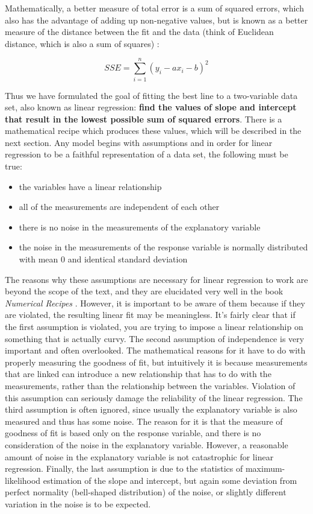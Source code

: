 \documentclass[
  letterpaper,
  DIV=11,
  numbers=noendperiod]{scrreprt}
\begin{document}
Mathematically, a better measure of total error is a sum of squared
errors, which also has the advantage of adding up non-negative values,
but is known as a better measure of the distance between the fit and the
data (think of Euclidean distance, which is also a sum of squares)
:

\[ SSE = \sum_{i=1}^n ( y_i -  a x_i - b )^2 \]

Thus we have formulated the goal of fitting the best line to a
two-variable data set, also known as linear regression: \textbf{find the
values of slope and intercept that result in the lowest possible sum of
squared errors}. There is a mathematical recipe which produces these
values, which will be described in the next section. Any model begins
with  assumptions and in order for
linear regression to be a faithful representation of a data set, the
following must be true:

\begin{itemize}
\item
  the variables have a linear relationship
\item
  all of the measurements are independent of each other
\item
  there is no noise in the measurements of the explanatory variable
\item
  the noise in the measurements of the response variable is normally
  distributed with mean 0 and identical standard deviation
\end{itemize}

The reasons why these assumptions are necessary for linear regression to
work are beyond the scope of the text, and they are elucidated very well
in the book \emph{Numerical Recipes} \cite{press_numerical_2007}.
However, it is important to be aware of them because if they are
violated, the resulting linear fit may be meaningless. It's fairly clear
that if the first assumption is violated, you are trying to impose a
linear relationship on something that is actually curvy. The second
assumption of independence is very important and often overlooked. The
mathematical reasons for it have to do with properly measuring the
goodness of fit, but intuitively it is because measurements that are
linked can introduce a new relationship that has to do with the
measurements, rather than the relationship between the variables.
Violation of this assumption can seriously damage the reliability of the
linear regression. The third assumption is often ignored, since usually
the explanatory variable is also measured and thus has some noise. The
reason for it is that the measure of goodness of fit is based only on
the response variable, and there is no consideration of the noise in the
explanatory variable. However, a reasonable amount of noise in the
explanatory variable is not catastrophic for linear regression. Finally,
the last assumption is due to the statistics of maximum-likelihood
estimation of the slope and intercept, but again some deviation from
perfect normality (bell-shaped distribution) of the noise, or slightly
different variation in the noise is to be expected.
\end{document}
